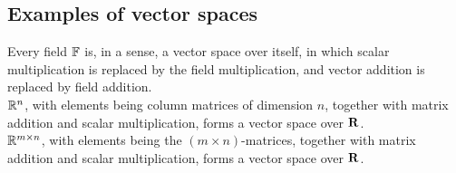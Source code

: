     \subsection{Examples of vector spaces}
        Every field $\mathbb{F}$ is, in a sense, a vector space over itself, in which scalar multiplication is replaced by the field multiplication, and vector addition is replaced by field addition. \\

        $\mathbb{R}^n$, with elements being column matrices of dimension $n$, together with matrix addition and scalar multiplication, forms a vector space over $\vb{R}$. \\

        $\mathbb{R}^{m \times n}$, with elements being the $(m \times n)$-matrices, together with matrix addition and scalar multiplication, forms a vector space over $\vb{R}$. \\
